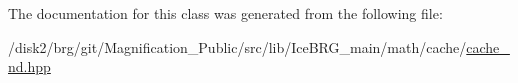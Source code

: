 The documentation for this class was generated from the following file\+:\begin{DoxyCompactItemize}
\item 
/disk2/brg/git/\+Magnification\+\_\+\+Public/src/lib/\+Ice\+B\+R\+G\+\_\+main/math/cache/\hyperlink{cache__nd_8hpp}{cache\+\_\+nd.\+hpp}\end{DoxyCompactItemize}

